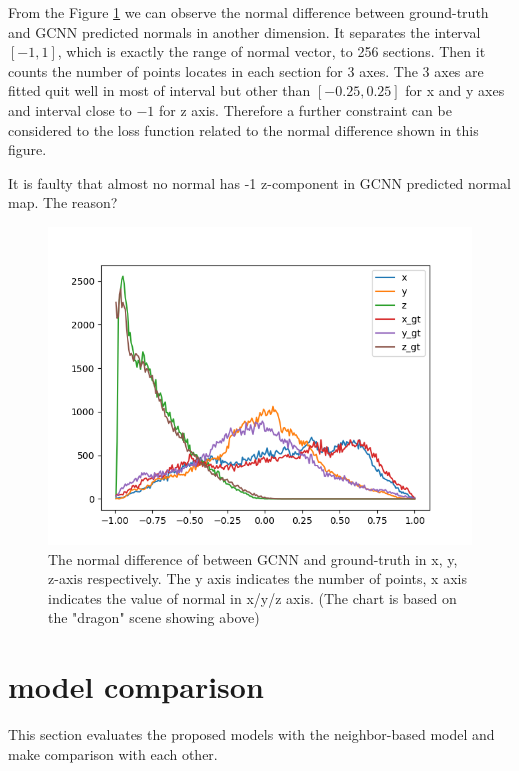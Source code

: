 From the Figure \ref{fig:normal-histo-diff} we can observe the normal difference between ground-truth and GCNN predicted normals in another dimension. It separates the interval $ \left[ -1,1 \right] $, which is exactly the range of normal vector, to 256 sections. Then it counts the number of points locates in each section for 3 axes.  The 3 axes are fitted quit well in most of interval but other than $ \left[ -0.25,0.25 \right] $ for x and y axes and  interval close to $ -1 $ for z axis. Therefore a further constraint can be considered to the loss function related to the normal difference shown in this figure.

It is faulty that almost no normal has -1 z-component in GCNN predicted normal map. The reason?
\begin{figure}[h!]
	\centering
	\includegraphics[width=\linewidth]{./Figures/normal-histo-diff.png}
	\caption{The normal difference of between GCNN and ground-truth in x, y, z-axis respectively. The y axis indicates the number of points, x axis indicates the value of normal in x/y/z axis. (The chart is based on the "dragon" scene showing above)}
	\label{fig:normal-histo-diff}
\end{figure}


\newpage 
\section{model comparison}
This section evaluates the proposed models with the neighbor-based model and make comparison with each other.


